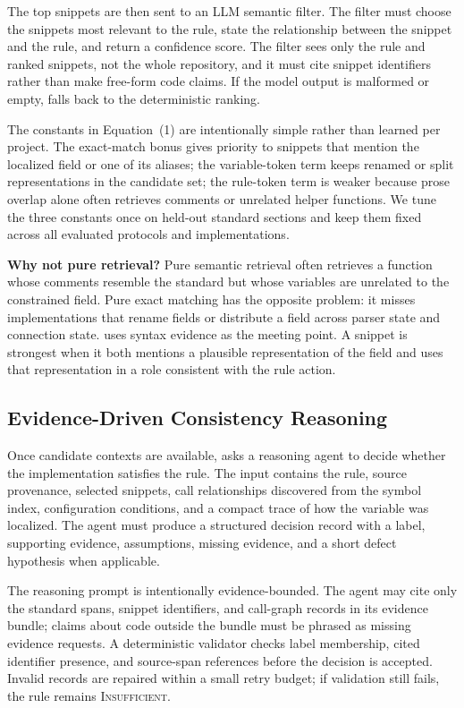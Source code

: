 The top snippets are then sent to an LLM semantic filter. The filter must choose
the snippets most relevant to the rule, state the relationship between the
snippet and the rule, and return a confidence score. The filter sees only the
rule and ranked snippets, not the whole repository, and it must cite snippet
identifiers rather than make free-form code claims. If the model output is
malformed or empty, \tool{} falls back to the deterministic ranking.

The constants in Equation~(1) are intentionally simple rather than learned per
project. The exact-match bonus gives priority to snippets that mention the
localized field or one of its aliases; the variable-token term keeps renamed or
split representations in the candidate set; the rule-token term is weaker
because prose overlap alone often retrieves comments or unrelated helper
functions. We tune the three constants once on held-out standard sections and
keep them fixed across all evaluated protocols and implementations.

\textbf{Why not pure retrieval?}
Pure semantic retrieval often retrieves a function whose comments resemble the
standard but whose variables are unrelated to the constrained field. Pure exact
matching has the opposite problem: it misses implementations that rename fields
or distribute a field across parser state and connection state. \tool{} uses
syntax evidence as the meeting point. A snippet is strongest when it both
mentions a plausible representation of the field and uses that representation
in a role consistent with the rule action.

\subsection{Evidence-Driven Consistency Reasoning}
\label{sec:reasoning}

Once candidate contexts are available, \tool{} asks a reasoning agent to decide
whether the implementation satisfies the rule. The input contains the rule,
source provenance, selected snippets, call relationships discovered from the
symbol index, configuration conditions, and a compact trace of how the variable
was localized. The agent must produce a structured decision record with a
label, supporting evidence, assumptions, missing evidence, and a short defect
hypothesis when applicable.

The reasoning prompt is intentionally evidence-bounded. The agent may cite only
the standard spans, snippet identifiers, and call-graph records in its evidence
bundle; claims about code outside the bundle must be phrased as missing
evidence requests. A deterministic validator checks label membership, cited
identifier presence, and source-span references before the decision is accepted.
Invalid records are repaired within a small retry budget; if validation still
fails, the rule remains \textsc{Insufficient}.

